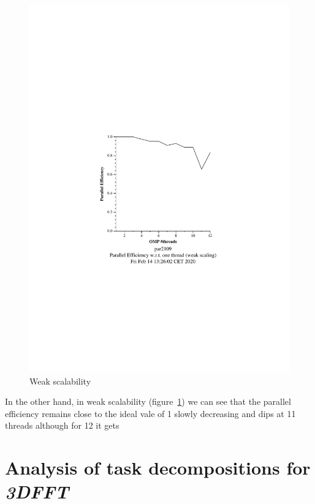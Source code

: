 \begin{figure}[H]%
    \caption{Weak scalability}%
    \label{fig:weak}
    \centering
    \includegraphics[width=\textwidth]{./data/pi/pi_omp-100000000-1-12-3-weak-boada-3.pdf}
\end{figure}

In the other hand, in weak scalability (figure~\ref{fig:weak}) we can see that the parallel efficiency remains close to the ideal vale of 1 slowly decreasing and dips at 11 threads although for 12 it gets 





\section{Analysis of task decompositions for \emph{3DFFT}}%
\label{sec:analysis_of_task_decompositions_for_3dfft}

